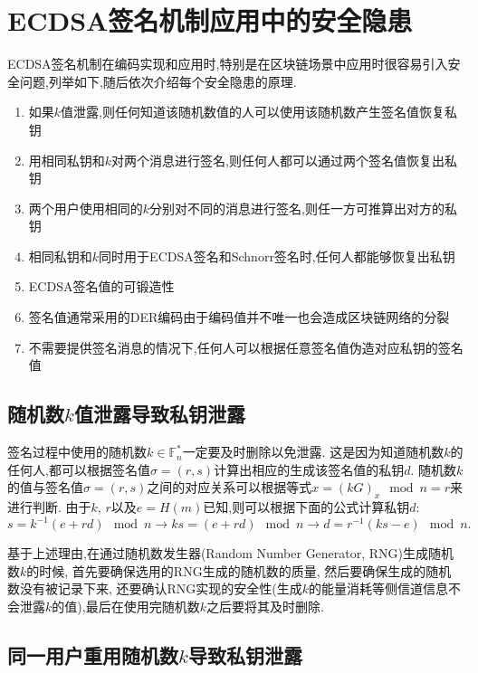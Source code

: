 \documentclass{article}
\newcommand{\F}{\mathbb{F}}
\begin{document}
\section{ECDSA签名机制应用中的安全隐患}

ECDSA签名机制在编码实现和应用时,特别是在区块链场景中应用时很容易引入安全问题,列举如下,随后依次介绍每个安全隐患的原理.
\begin{enumerate}
\item 如果$k$值泄露,则任何知道该随机数值的人可以使用该随机数产生签名值恢复私钥
\item 用相同私钥和$k$对两个消息进行签名,则任何人都可以通过两个签名值恢复出私钥
\item 两个用户使用相同的$k$分别对不同的消息进行签名,则任一方可推算出对方的私钥
\item 相同私钥和$k$同时用于ECDSA签名和Schnorr签名时,任何人都能够恢复出私钥
\item ECDSA签名值的可锻造性
\item 签名值通常采用的DER编码由于编码值并不唯一也会造成区块链网络的分裂
\item 不需要提供签名消息的情况下,任何人可以根据任意签名值伪造对应私钥的签名值
\end{enumerate}

\subsection{随机数$k$值泄露导致私钥泄露}

签名过程中使用的随机数$k\in\F_n^*$一定要及时删除以免泄露.
这是因为知道随机数$k$的任何人,都可以根据签名值$\sigma=(r,s)$计算出相应的生成该签名值的私钥$d$.
随机数$k$的值与签名值$\sigma=(r,s)$之间的对应关系可以根据等式$x = (kG)_x \mod n = r$来进行判断.
由于$k$, $r$以及$e=H(m)$已知,则可以根据下面的公式计算私钥$d$:
$$s=k^{-1}(e+rd) \mod n \rightarrow ks = (e + rd)\mod n \rightarrow d = r^{-1}(ks - e)\mod n.$$

基于上述理由,在通过随机数发生器(Random Number Generator, RNG)生成随机数$k$的时候,
首先要确保选用的RNG生成的随机数的质量, 然后要确保生成的随机数没有被记录下来, 
还要确认RNG实现的安全性(生成$k$的能量消耗等侧信道信息不会泄露$k$的值),最后在使用完随机数$k$之后要将其及时删除.

\subsection{同一用户重用随机数$k$导致私钥泄露\label{subsec-1usereusek}}
\end{document}
